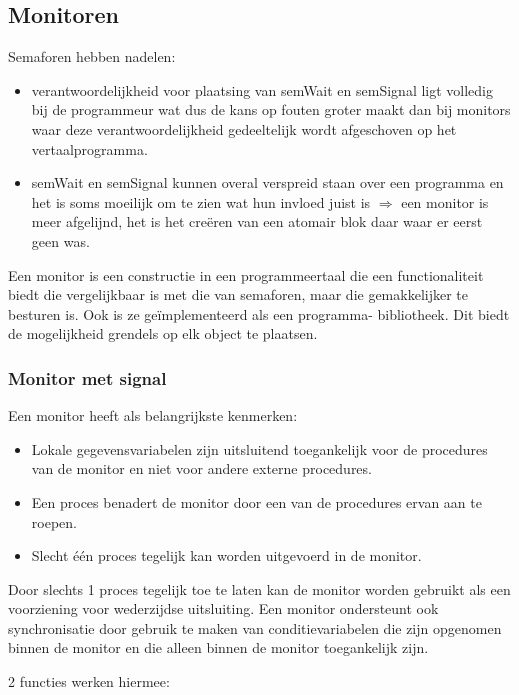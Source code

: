 \subsection{Monitoren}

Semaforen hebben nadelen:

\begin{itemize}
\item verantwoordelijkheid voor plaatsing van semWait en semSignal ligt volledig bij de programmeur wat dus de kans op fouten groter maakt dan bij monitors waar deze verantwoordelijkheid gedeeltelijk wordt afgeschoven op het vertaalprogramma.
\item semWait en semSignal kunnen overal verspreid staan over een programma en het is soms moeilijk om te zien wat hun invloed juist is $\Rightarrow$ een monitor is meer afgelijnd, het is het creëren van een atomair blok daar waar er eerst geen was.
\end{itemize}

Een monitor is een constructie in een programmeertaal die een functionaliteit biedt die vergelijkbaar is met die van semaforen, maar die gemakkelijker te besturen is. Ook is ze geïmplementeerd als een programma- bibliotheek. Dit biedt de mogelijkheid grendels op elk object te plaatsen.

\subsubsection{Monitor met signal}

Een monitor heeft als belangrijkste kenmerken:

\begin{itemize}
\item Lokale gegevensvariabelen zijn uitsluitend toegankelijk voor de procedures van de monitor en niet voor andere externe procedures.
\item Een proces benadert de monitor door een van de procedures ervan aan te roepen.
\item Slecht één proces tegelijk kan worden uitgevoerd in de monitor.
\end{itemize}

Door slechts 1 proces tegelijk toe te laten kan de monitor worden gebruikt als een voorziening voor wederzijdse uitsluiting. Een monitor ondersteunt ook synchronisatie door gebruik te maken van conditievariabelen die zijn opgenomen binnen de monitor en die alleen binnen de monitor toegankelijk zijn.

2 functies werken hiermee:

